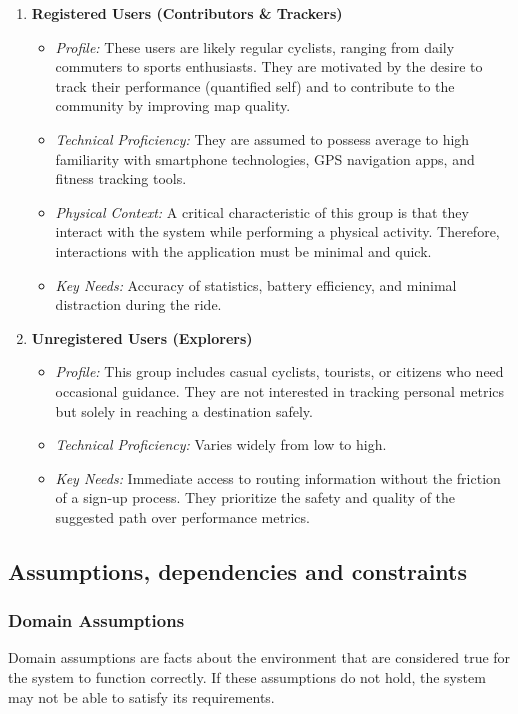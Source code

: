 \begin{enumerate}
    \item \textbf{Registered Users (Contributors \& Trackers)}
    \begin{itemize}
        \item \textit{Profile:} These users are likely regular cyclists, ranging from daily commuters to sports enthusiasts. They are motivated by the desire to track their performance (quantified self) and to contribute to the community by improving map quality.
        \item \textit{Technical Proficiency:} They are assumed to possess average to high familiarity with smartphone technologies, GPS navigation apps, and fitness tracking tools.
        \item \textit{Physical Context:} A critical characteristic of this group is that they interact with the system while performing a physical activity. Therefore, interactions with the application must be minimal and quick.
        \item \textit{Key Needs:} Accuracy of statistics, battery efficiency, and minimal distraction during the ride.
    \end{itemize}

    \item \textbf{Unregistered Users (Explorers)}
    \begin{itemize}
        \item \textit{Profile:} This group includes casual cyclists, tourists, or citizens who need occasional guidance. They are not interested in tracking personal metrics but solely in reaching a destination safely.
        \item \textit{Technical Proficiency:} Varies widely from low to high.
        \item \textit{Key Needs:} Immediate access to routing information without the friction of a sign-up process. They prioritize the safety and quality of the suggested path over performance metrics.
    \end{itemize}
\end{enumerate}
\clearpage

\clearpage
\subsection{Assumptions, dependencies and constraints}

\subsubsection{Domain Assumptions}
Domain assumptions are facts about the environment that are considered true for the system to function correctly. If these assumptions do not hold, the system may not be able to satisfy its requirements.

